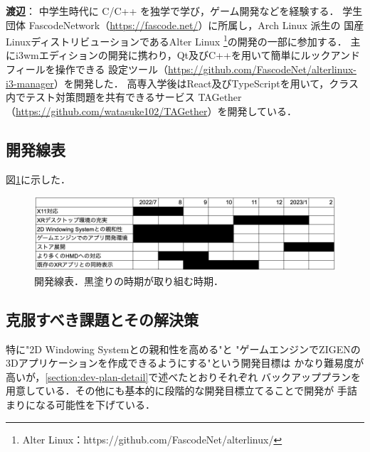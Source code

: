 \textbf{渡辺}：
中学生時代に C/C++ を独学で学び，ゲーム開発などを経験する．
学生団体 FascodeNetwork（\url{https://fascode.net/}）に所属し，Arch Linux 派生の
国産LinuxディストリビューションであるAlter Linux
\footnote{Alter Linux：https://github.com/FascodeNet/alterlinux/}の開発の一部に参加する．
主にi3wmエディションの開発に携わり，Qt及びC++を用いて簡単にルックアンドフィールを操作できる
設定ツール（\url{https://github.com/FascodeNet/alterlinux-i3-manager}）を開発した．
高専入学後はReact及びTypeScriptを用いて，クラス内でテスト対策問題を共有できるサービス
TAGether（\url{https://github.com/watasuke102/TAGether}）を開発している．

\subsection{開発線表}

図\ref{fig:dev-schedule}に示した．

\begin{figure}[htbp]
      \centering
      \includegraphics[keepaspectratio, width=\linewidth]{fig/dev-schedule.png}
      \caption{開発線表．黒塗りの時期が取り組む時期．}
      \label{fig:dev-schedule}
\end{figure}

\subsection{克服すべき課題とその解決策}

特に"2D Windowing Systemとの親和性を高める"と
"ゲームエンジンでZIGENの3Dアプリケーションを作成できるようにする"という開発目標は
かなり難易度が高いが，\ref{section:dev-plan-detail}で述べたとおりそれぞれ
バックアッププランを用意している．その他にも基本的に段階的な開発目標立てることで開発が
手詰まりになる可能性を下げている．

